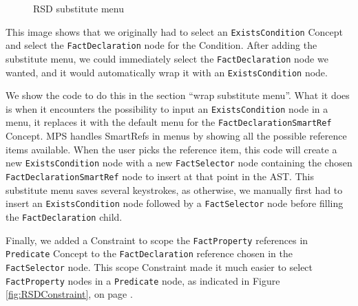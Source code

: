 \begin{figure}[h]
    \centering
    \caption{RSD substitute menu}
    \label{fig:RSDSubstituteMenu}
\end{figure}

This image shows that we originally had to select an \texttt{ExistsCondition} Concept and select the \linebreak\texttt{FactDeclaration} node for the Condition.
After adding the substitute menu, we could immediately select the \texttt{FactDeclaration} node we wanted, and it would automatically wrap it with an \texttt{ExistsCondition} node.

We show the code to do this in the section ``wrap substitute menu''.
What it does is when it encounters the possibility to input an \texttt{ExistsCondition} node in a menu, it replaces it with the default menu for the \linebreak\texttt{FactDeclarationSmartRef} Concept.
MPS handles SmartRefs in menus by showing all the possible reference items available.
When the user picks the reference item, this code will create a new \texttt{ExistsCondition} node with a new \texttt{FactSelector} node containing the chosen \texttt{FactDeclarationSmartRef} node to insert at that point in the AST.
This substitute menu saves several keystrokes, as otherwise, we manually first had to insert an \texttt{ExistsCondition} node followed by a \texttt{FactSelector} node before filling the \texttt{FactDeclaration} child.

Finally, we added a Constraint to scope the \texttt{FactProperty} references in \texttt{Predicate} Concept to the \linebreak\texttt{FactDeclaration} reference chosen in the \texttt{FactSelector} node.
This scope Constraint made it much easier to select \texttt{FactProperty} nodes in a \texttt{Predicate} node, as indicated in Figure \ref{fig:RSDConstraint}, on page \pageref{fig:RSDConstraint}.

